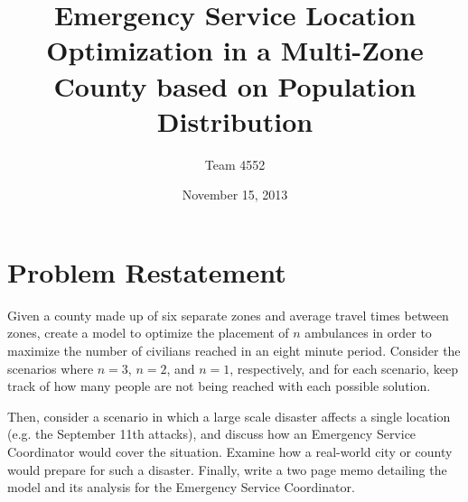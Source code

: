 \documentclass[notitlepage, 12pt]{article}
\title{\textbf{Emergency Service Location Optimization in a Multi-Zone County based on Population Distribution}}
\author{Team 4552}
\date{November 15, 2013}
\begin{document}
\maketitle

\tableofcontents

\section{Problem Restatement}
Given a county made up of six separate zones and average travel times between zones, create a model to optimize the placement of $n$ ambulances in order to maximize the number of civilians reached in an eight minute period. Consider the scenarios where $n = 3$, $n = 2$, and $n = 1$, respectively, and for each scenario, keep track of how many people are not being reached with each possible solution.

Then, consider a scenario in which a large scale disaster affects a single location (e.g. the September 11th attacks), and discuss how an Emergency Service Coordinator would cover the situation. Examine how a real-world city or county would prepare for such a disaster. Finally, write a two page memo detailing the model and its analysis for the Emergency Service Coordinator.
\end{document}
